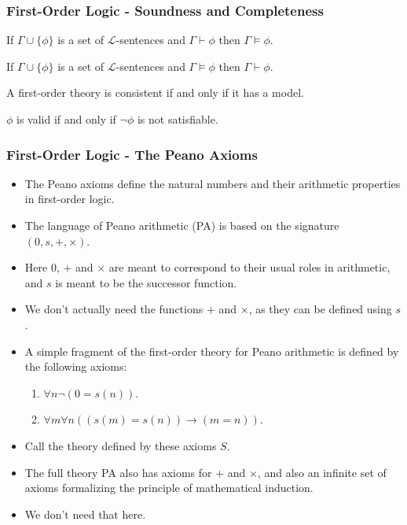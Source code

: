 \documentclass[handout]{beamer}
\newcommand{\ra}{\rightarrow}
\begin{document}
\begin{frame}
\frametitle{First-Order Logic - Soundness and Completeness}
\begin{theorem}[soundness]
If $\Gamma\cup\{\phi\}$ is a set of $\mathscr{L}$-sentences and $\Gamma\vdash \phi$ then $\Gamma\models \phi$.
\end{theorem}
\vspace{0.3cm}
\begin{theorem}[completeness]
If $\Gamma\cup\{\phi\}$ is a set of $\mathscr{L}$-sentences and $\Gamma\models \phi$ then $\Gamma\vdash \phi$.
\end{theorem}
\vspace{0.3cm}
\begin{corollary}\label{C:cons}
A first-order theory is consistent if and only if it has a model.
\end{corollary}
\vspace{0.3cm}
\begin{corollary}\label{C:val}
$\phi$ is valid if and only if $\neg \phi$ is not satisfiable.
\end{corollary}
\end{frame}

\begin{frame}
\frametitle{First-Order Logic - The Peano Axioms} 
\begin{itemize}
\item The Peano axioms define the natural numbers and their arithmetic properties in first-order logic. 
\item The language of Peano arithmetic (PA) is based on the signature $(0,s,+,\times)$. 
\item Here $0$, $+$ and $\times$ are meant to correspond to their usual roles in arithmetic, and $s$ is meant to be the successor function. 
\item We don't actually need the functions $+$ and $\times$, as they can be defined using $s$. 
\item A simple fragment of the first-order theory for Peano arithmetic is defined by the following axioms:
\begin{enumerate}
\item $\forall n \neg (0 =s(n))$.
\item $\forall m\forall n((s(m)=s(n))\ra (m =n))$.
\end{enumerate}
\item Call the theory defined by these axioms $S$. 
\item The full theory PA also has axioms for $+$ and $\times$, and also an infinite set of axioms formalizing the principle of mathematical induction. 
\item We don't need that here.
\end{itemize}
\end{frame}
\end{document}
